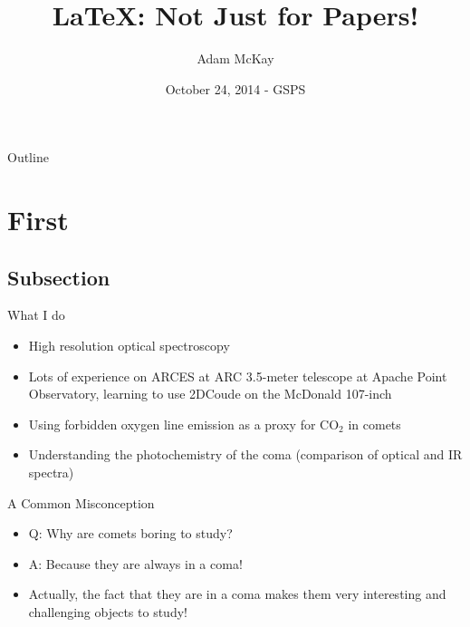 \documentclass{beamer}
\title[McKay - GSPS - October 24, 2014] %
{LaTeX: Not Just for Papers!}
\author[Author] %
{Adam McKay\inst{1}}
\date[Short Occasion] %
{October 24, 2014 - GSPS}
\institute[Universities of Somewhere and Elsewhere] %
{
  \inst{1} University of Texas Austin/McDonald Observatory
}
\begin{document}
{

\begin{frame}
  \titlepage
\end{frame}
}





\begin{frame}{Outline}
 \tableofcontents
\end{frame}

\section{First}
\subsection{Subsection}

\begin{frame}{What I do}
\begin{itemize}
\item High resolution optical spectroscopy
\item Lots of experience on ARCES at ARC 3.5-meter telescope at Apache Point Observatory, learning to use 2DCoude on the McDonald 107-inch
\item Using forbidden oxygen line emission as a proxy for CO$_2$ in comets
\item Understanding the photochemistry of the coma (comparison of optical and IR spectra)
\end{itemize}
\end{frame}

\begin{frame}{A Common Misconception}
 \begin{itemize}
  \item Q: Why are comets boring to study?
\pause
\item A: Because they are always in a coma!
\pause
\item Actually, the fact that they are in a coma makes them very interesting and challenging objects to study!
 \end{itemize}
\end{frame}
\end{document}
